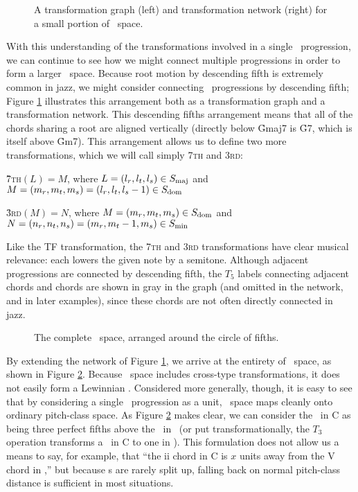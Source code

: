 \begin{figure}[tbp]
  \caption[A transformation graph and network for a small portion of \tf\
    space]{A transformation graph (left) and transformation network (right)
    for a small portion of \tf\ space.}
  \label{tf:trans-graph-large}
\end{figure}

With this understanding of the transformations involved in a single \tfo\
progression, we can continue to see how we might connect multiple progressions
in order to form a larger \tf\ space. Because root motion by descending
fifth is extremely common in jazz, we might consider connecting \tfo\
progressions by descending fifth; Figure \ref{tf:trans-graph-large}
illustrates this arrangement both as a transformation graph and a
transformation network.  This descending fifths arrangement means that all of
the chords sharing a root are aligned vertically (directly below \h{Gmaj7} is
\h{G7}, which is itself above \h{Gm7}). This arrangement allows us to define
two more transformations, which we will call simply \textsc{7th} and
\textsc{3rd}:

\vspace{0.5\baselineskip}
\h{7}\textsc{th}$(L) = M$, where $L = (l_r, l_t, l_s) \in S_{\mathrm{maj}}$ and $M=(m_r, m_t,
m_s)=(l_r, l_t, l_s-1) \in S_{\mathrm{dom}}$

\h{3}\textsc{rd}$(M) = N$, where $M = (m_r, m_t, m_s) \in S_{\mathrm{dom}}$ and $N=(n_r, n_t,
n_s)=(m_r, m_t-1, m_s) \in S_{\mathrm{min}}$
\vspace{0.5\baselineskip}

\noindent Like the TF transformation, the \textsc{7th} and \textsc{3rd}
transformations have clear musical relevance: each lowers the given note by a
semitone. Although adjacent progressions are connected by descending fifth,
the $T_5$ labels connecting adjacent \ii chords and \I chords
are shown in gray in the graph (and omitted in the network, and in later
examples), since these chords are not often directly connected in jazz.

\begin{figure}[thb]
  \centerGraphic{eps/ch2/tf-circle-fifths.pdf}
  \caption{The complete \tf\ space, arranged around the circle of fifths.}
  \label{tf:tf-circle-fifths}
\end{figure}

By extending the network of Figure \ref{tf:trans-graph-large}, we arrive at
the entirety of \tf\ space, as shown in Figure \ref{tf:tf-circle-fifths}.
Because \tf\ space includes cross-type transformations, it does not easily
form a Lewinnian \gis.\fn{tf-8} Considered more generally, though, it is easy
to see that by considering a single \tfo\ progression as a unit, \tf\ space
maps cleanly onto ordinary pitch-class space. As Figure
\ref{tf:tf-circle-fifths} makes clear, we can consider the \tfo\ in C as
being three perfect fifths above the \tfo\ in \Eflat\ (or put
transformationally, the $T_3$ operation transforms a \tfo\ in C to one in
\Eflat). This formulation does not allow us a means to say, for example, that
“the ii chord in C is $x$ units away from the V chord in \Eflat,” but because
\tfo{}s are rarely split up, falling back on normal pitch-class distance is
sufficient in most situations.\fn{tf-9}

